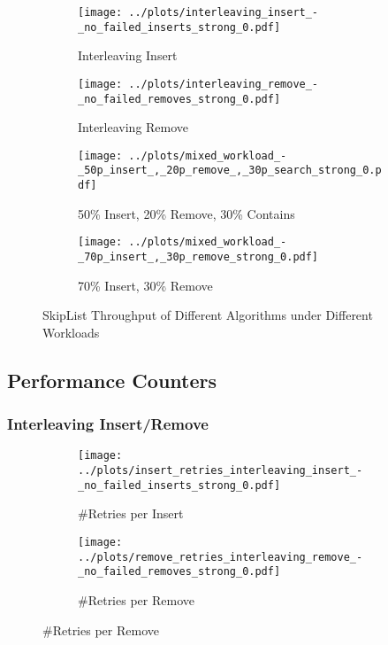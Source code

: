\begin{figure}[H]
    \centering
    
    \begin{subfigure}[b]{0.49\textwidth}
        \texttt{[image: ../plots/interleaving\_insert\_-\_no\_failed\_inserts\_strong\_0.pdf]}
        \caption{Interleaving Insert}
    \end{subfigure}
    \begin{subfigure}[b]{0.49\textwidth}
        \texttt{[image: ../plots/interleaving\_remove\_-\_no\_failed\_removes\_strong\_0.pdf]}
        \caption{Interleaving Remove}
    \end{subfigure}
    
    \begin{subfigure}[b]{0.49\textwidth}
        \texttt{[image: ../plots/mixed\_workload\_-\_50p\_insert\_,\_20p\_remove\_,\_30p\_search\_strong\_0.pdf]}
        \caption{50\% Insert, 20\% Remove, 30\% Contains}
    \end{subfigure}
    \begin{subfigure}[b]{0.49\textwidth}
        \texttt{[image: ../plots/mixed\_workload\_-\_70p\_insert\_,\_30p\_remove\_strong\_0.pdf]}
        \caption{70\% Insert, 30\% Remove}
    \end{subfigure}
    
    \caption{SkipList Throughput of Different Algorithms under Different Workloads}
\end{figure}


\subsection{Performance Counters}

\subsubsection*{Interleaving Insert/Remove}

\begin{figure}[H]
    \centering
    
    \begin{subfigure}[b]{0.49\textwidth}
        \texttt{[image: ../plots/insert\_retries\_interleaving\_insert\_-\_no\_failed\_inserts\_strong\_0.pdf]}
        \caption{\#Retries per Insert}
    \end{subfigure}
    \begin{subfigure}[b]{0.49\textwidth}
        \texttt{[image: ../plots/remove\_retries\_interleaving\_remove\_-\_no\_failed\_removes\_strong\_0.pdf]}
        \caption{\#Retries per Remove}
    \end{subfigure}
\end{figure} 


